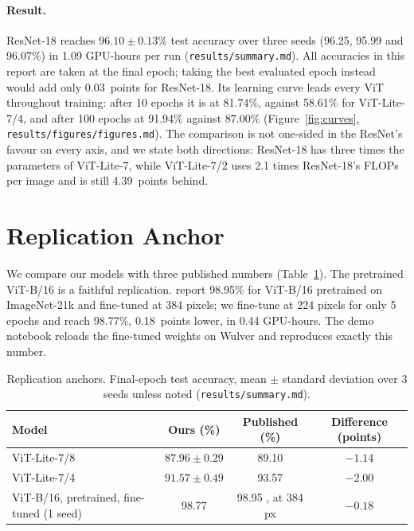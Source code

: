 \documentclass[11pt]{article}
\newcommand{\file}[1]{\nolinkurl{#1}}
\begin{document}
\paragraph{Result.} ResNet-18 reaches $96.10 \pm 0.13\%$ test accuracy over three seeds (96.25, 95.99 and 96.07\%) in 1.09 GPU-hours per run (\file{results/summary.md}). All accuracies in this report are taken at the final epoch; taking the best evaluated epoch instead would add only 0.03~points for ResNet-18. Its learning curve leads every ViT throughout training: after 10 epochs it is at 81.74\%, against 58.61\% for ViT-Lite-7/4, and after 100 epochs at 91.94\% against 87.00\% (Figure~\ref{fig:curves}, \file{results/figures/figures.md}). The comparison is not one-sided in the ResNet's favour on every axis, and we state both directions: ResNet-18 has three times the parameters of ViT-Lite-7, while ViT-Lite-7/2 uses 2.1 times ResNet-18's FLOPs per image and is still 4.39~points behind.

\section{Replication Anchor}\label{sec:anchor}

We compare our models with three published numbers (Table~\ref{tab:anchor}). The pretrained ViT-B/16 is a faithful replication. \citet{dosovitskiy2021vit} report 98.95\% for ViT-B/16 pretrained on ImageNet-21k and fine-tuned at 384 pixels; we fine-tune at 224 pixels for only 5 epochs and reach 98.77\%, 0.18~points lower, in 0.44 GPU-hours. The demo notebook reloads the fine-tuned weights on Wulver and reproduces exactly this number.

\begin{table}[htbp]
\centering
\small
\caption{Replication anchors. Final-epoch test accuracy, mean $\pm$ standard deviation over 3 seeds unless noted (\file{results/summary.md}).}
\label{tab:anchor}
\begin{tabular}{@{}lccc@{}}
\toprule
Model & Ours (\%) & Published (\%) & Difference (points) \\
\midrule
ViT-Lite-7/8 & $87.96 \pm 0.29$ & 89.10 \citep{hassani2021cct} & $-1.14$ \\
ViT-Lite-7/4 & $91.57 \pm 0.49$ & 93.57 \citep{hassani2021cct} & $-2.00$ \\
ViT-B/16, pretrained, fine-tuned (1 seed) & 98.77 & 98.95 \citep{dosovitskiy2021vit}, at 384 px & $-0.18$ \\
\bottomrule
\end{tabular}
\end{table}
\end{document}
